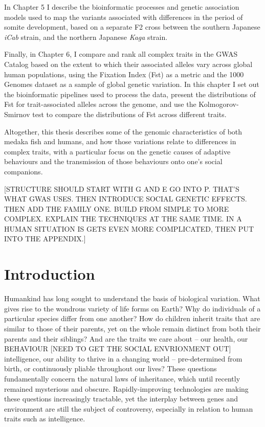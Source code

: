 \documentclass[
]{book}
\begin{document}
In Chapter 5 I describe the bioinformatic processes and genetic association models used to map the variants associated with differences in the period of somite development, based on a separate F2 cross between the southern Japanese \emph{iCab} strain, and the northern Japanese \emph{Kaga} strain.

Finally, in Chapter 6, I compare and rank all complex traits in the GWAS Catalog based on the extent to which their associated alleles vary across global human populations, using the Fixation Index (Fst) as a metric and the 1000 Genomes dataset as a sample of global genetic variation. In this chapter I set out the bioinformatic pipelines used to process the data, present the distributions of Fst for trait-associated alleles across the genome, and use the Kolmogorov-Smirnov test to compare the distributions of Fst across different traits.

Altogether, this thesis describes some of the genomic characteristics of both medaka fish and humans, and how those variations relate to differences in complex traits, with a particular focus on the genetic causes of adaptive behaviours and the transmission of those behaviours onto one's social companions.

{[}STRUCTURE SHOULD START WITH G AND E GO INTO P. THAT'S WHAT GWAS USES. THEN INTRODUCE SOCIAL GENETIC EFFECTS. THEN ADD THE FAMILY ONE. BUILD FROM SIMPLE TO MORE COMPLEX. EXPLAIN THE TECHNIQUES AT THE SAME TIME. IN A HUMAN SITUATION IS GETS EVEN MORE COMPLICATED, THEN PUT INTO THE APPENDIX.{]}

\hypertarget{Introduction}{%
\chapter{Introduction}\label{Introduction}}

Humankind has long sought to understand the basis of biological variation. What gives rise to the wondrous variety of life forms on Earth? Why do individuals of a particular species differ from one another? How do children inherit traits that are similar to those of their parents, yet on the whole remain distinct from both their parents and their siblings? And are the traits we care about -- our health, our BEHAVIOUR {[}NEED TO GET THE SOCIAL ENVRIONMENT OUT{]} intelligence, our ability to thrive in a changing world -- pre-determined from birth, or continuously pliable throughout our lives? These questions fundamentally concern the natural laws of inheritance, which until recently remained mysterious and obscure. Rapidly-improving technologies are making these questions increasingly tractable, yet the interplay between genes and environment are still the subject of controversy, especially in relation to human traits such as intelligence.
\end{document}
